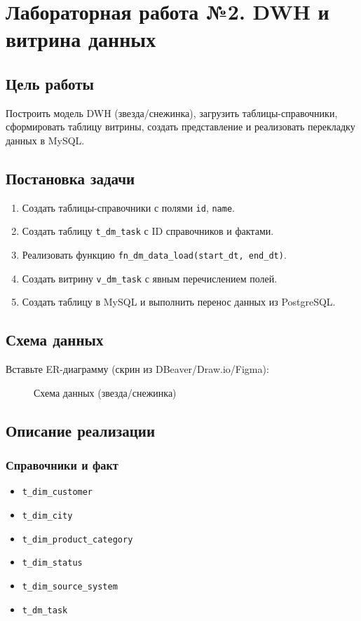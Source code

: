 \documentclass[14pt,a4paper]{extarticle}
\begin{document}
\newpage
\section{Лабораторная работа №2. DWH и витрина данных}

\subsection{Цель работы}
Построить модель DWH (звезда/снежинка), загрузить таблицы-справочники, сформировать таблицу витрины, создать представление и реализовать перекладку данных в MySQL.

\subsection{Постановка задачи}
\begin{enumerate}
    \item Создать таблицы-справочники с полями \texttt{id}, \texttt{name}.
    \item Создать таблицу \texttt{t\_dm\_task} с ID справочников и фактами.
    \item Реализовать функцию \texttt{fn\_dm\_data\_load(start\_dt, end\_dt)}.
    \item Создать витрину \texttt{v\_dm\_task} с явным перечислением полей.
    \item Создать таблицу в MySQL и выполнить перенос данных из PostgreSQL.
\end{enumerate}

\subsection{Схема данных}
Вставьте ER-диаграмму (скрин из DBeaver/Draw.io/Figma):
\begin{figure}[H]
    \centering
    \caption{Схема данных (звезда/снежинка)}
\end{figure}

\subsection{Описание реализации}
\subsubsection{Справочники и факт}
\begin{itemize}
    \item \texttt{t\_dim\_customer}
    \item \texttt{t\_dim\_city}
    \item \texttt{t\_dim\_product\_category}
    \item \texttt{t\_dim\_status}
    \item \texttt{t\_dim\_source\_system}
    \item \texttt{t\_dm\_task}
\end{itemize}
\end{document}
